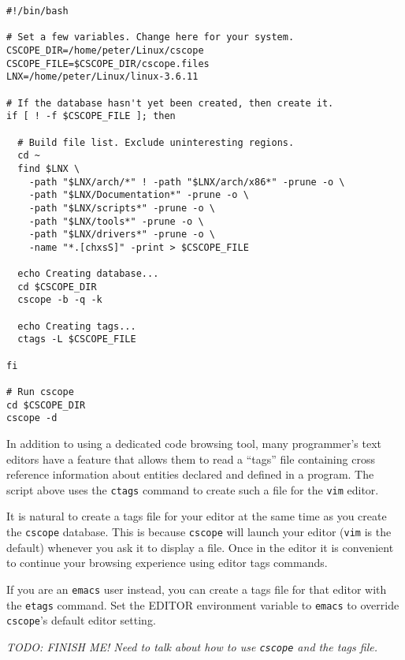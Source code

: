 \documentclass{article}
\newcommand{\command}[1]{\texttt{#1}}    %
\newcommand{\todo}[1]{\textit{TODO: #1}}
\begin{document}
\begin{verbatim}
#!/bin/bash

# Set a few variables. Change here for your system.
CSCOPE_DIR=/home/peter/Linux/cscope
CSCOPE_FILE=$CSCOPE_DIR/cscope.files
LNX=/home/peter/Linux/linux-3.6.11

# If the database hasn't yet been created, then create it.
if [ ! -f $CSCOPE_FILE ]; then

  # Build file list. Exclude uninteresting regions.
  cd ~
  find $LNX \
    -path "$LNX/arch/*" ! -path "$LNX/arch/x86*" -prune -o \
    -path "$LNX/Documentation*" -prune -o \
    -path "$LNX/scripts*" -prune -o \
    -path "$LNX/tools*" -prune -o \
    -path "$LNX/drivers*" -prune -o \
    -name "*.[chxsS]" -print > $CSCOPE_FILE

  echo Creating database...
  cd $CSCOPE_DIR
  cscope -b -q -k

  echo Creating tags...
  ctags -L $CSCOPE_FILE

fi

# Run cscope
cd $CSCOPE_DIR
cscope -d
\end{verbatim}

In addition to using a dedicated code browsing tool, many programmer's text editors have a
feature that allows them to read a ``tags'' file containing cross reference information about
entities declared and defined in a program. The script above uses the \command{ctags} command to
create such a file for the \command{vim} editor.

It is natural to create a tags file for your editor at the same time as you create the
\command{cscope} database. This is because \command{cscope} will launch your editor
(\command{vim} is the default) whenever you ask it to display a file. Once in the editor it is
convenient to continue your browsing experience using editor tags commands.

If you are an \command{emacs} user instead, you can create a tags file for that editor with the
\command{etags} command. Set the EDITOR environment variable to \command{emacs} to override
\command{cscope}'s default editor setting.

\todo{FINISH ME! Need to talk about how to use \command{cscope} and the tags file.}
\end{document}
